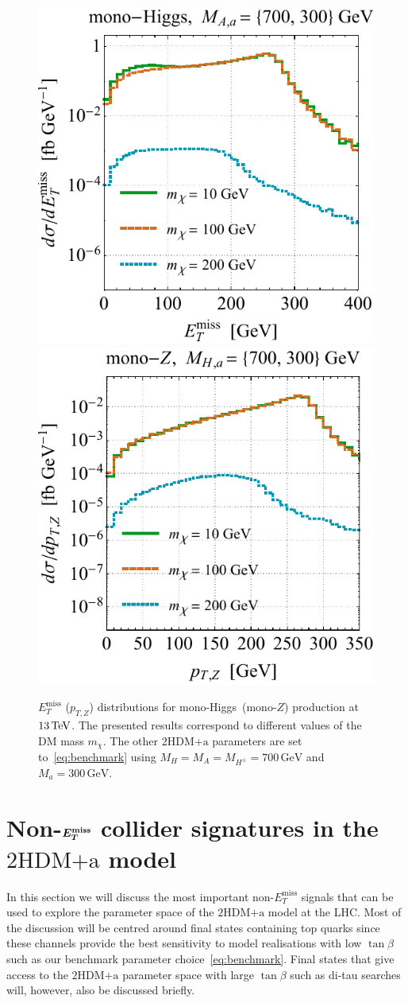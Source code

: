 \documentclass[review]{elsarticle}
\newcommand{\MET}{\ensuremath{E_T^\mathrm{miss}}\xspace}
\newcommand{\mA}{\ensuremath{M_{A}}\xspace}
\newcommand{\ma}{\ensuremath{M_{a}}\xspace}
\newcommand{\mH}{\ensuremath{M_{H}}\xspace}
\newcommand{\mHc}{\ensuremath{M_{H^{\pm}}}\xspace}
\newcommand{\hdma}{\ensuremath{\textrm{2HDM+a}}\xspace}
\def\bm#1{\mbox{\boldmath$#1$\unboldmath}}
\begin{document}
\begin{figure}[t!]
\centering
\includegraphics[height=0.45\textwidth]{mdml.pdf} \qquad 
\includegraphics[height=0.45\textwidth]{mdmr.pdf}
\vspace{2mm}
\caption{\label{fig:mdmvar} $\MET$ ($p_{T,Z}$) distributions for mono-Higgs~(mono-$Z$) production at $13 \, {\rm TeV}$. The presented results correspond to different values of the DM mass $m_\chi$. The other \hdma parameters are set to~\eqref{eq:benchmark} using $\mH = \mA = \mHc = 700 \, {\mathrm{GeV}}$ and $\ma = 300 \, {\mathrm{GeV}}$. }
\end{figure}


\section{Non-$\bm{E_T^{\rm miss}}$ collider signatures  in the \hdma model}
\label{sec:nonMET}

In this section we will discuss the most important non-$\MET$ signals that can be used to explore the parameter space of the \hdma model at the LHC. Most of the discussion will be centred around final states containing top quarks since these channels provide the best sensitivity to model realisations with low $\tan \beta$ such as our benchmark parameter choice~\eqref{eq:benchmark}. Final states that give access to the \hdma parameter space with large $\tan \beta$ such as di-tau searches will, however, also be discussed briefly. 
\end{document}
